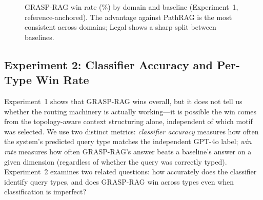 \begin{figure}[t]
\centering
{}
\caption{GRASP-RAG win rate (\%) by domain and baseline (Experiment~1,
  reference-anchored). The advantage against PathRAG is the most consistent
  across domains; Legal shows a sharp split between baselines.}
\label{fig:winrate_chart}
\end{figure}

\subsection{Experiment 2: Classifier Accuracy and Per-Type Win Rate}
\label{sec:exp2}

Experiment~1 shows that GRASP-RAG wins overall, but it does not tell us
whether the routing machinery is actually working---it is possible the win
comes from the topology-aware context structuring alone, independent of which
motif was selected.
We use two distinct metrics: \emph{classifier accuracy} measures how often the
system's predicted query type matches the independent GPT-4o label; \emph{win
rate} measures how often GRASP-RAG's answer beats a baseline's answer on a
given dimension (regardless of whether the query was correctly typed).
Experiment~2 examines two related questions: how accurately does the
classifier identify query types, and does GRASP-RAG win across types even
when classification is imperfect?

